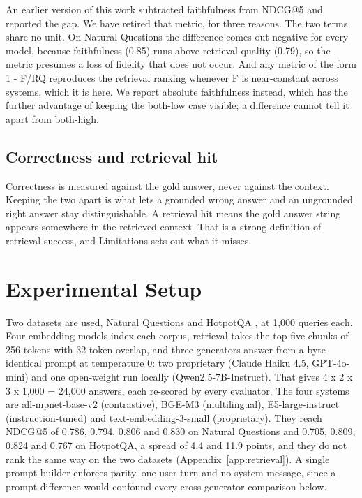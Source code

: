 \documentclass[11pt]{article}
\begin{document}
An earlier version of this work subtracted faithfulness from NDCG@5 and reported the gap. We have retired that metric, for three reasons. The two terms share no unit. On Natural Questions the difference comes out negative for every model, because faithfulness (0.85) runs above retrieval quality (0.79), so the metric presumes a loss of fidelity that does not occur. And any metric of the form 1 - F/RQ reproduces the retrieval ranking whenever F is near-constant across systems, which it is here. We report absolute faithfulness instead, which has the further advantage of keeping the both-low case visible; a difference cannot tell it apart from both-high.


\subsection{Correctness and retrieval hit}
\label{sec:def-correct}

Correctness is measured against the gold answer, never against the context. Keeping the two apart is what lets a grounded wrong answer and an ungrounded right answer stay distinguishable. A retrieval hit means the gold answer string appears somewhere in the retrieved context. That is a strong definition of retrieval success, and Limitations sets out what it misses.


\section{Experimental Setup}
\label{sec:setup}

Two datasets are used, Natural Questions \citep{kwiatkowski-etal-2019} and HotpotQA \citep{yang-etal-2018}, at 1,000 queries each. Four embedding models index each corpus, retrieval takes the top five chunks of 256 tokens with 32-token overlap, and three generators answer from a byte-identical prompt at temperature 0: two proprietary (Claude Haiku 4.5, GPT-4o-mini) and one open-weight run locally (Qwen2.5-7B-Instruct). That gives 4 x 2 x 3 x 1,000 = 24,000 answers, each re-scored by every evaluator. The four systems are all-mpnet-base-v2 (contrastive), BGE-M3 (multilingual), E5-large-instruct (instruction-tuned) and text-embedding-3-small (proprietary). They reach NDCG@5 of 0.786, 0.794, 0.806 and 0.830 on Natural Questions and 0.705, 0.809, 0.824 and 0.767 on HotpotQA, a spread of 4.4 and 11.9 points, and they do not rank the same way on the two datasets (Appendix~\ref{app:retrieval}). A single prompt builder enforces parity, one user turn and no system message, since a prompt difference would confound every cross-generator comparison below.
\end{document}
